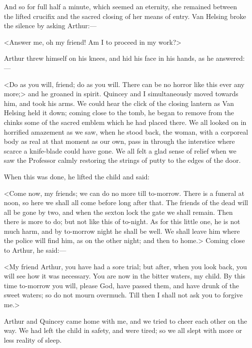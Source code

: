 And so for full half a minute, which seemed an eternity, she remained between the lifted crucifix and the sacred closing of her means of entry. Van Helsing broke the silence by asking Arthur:—

<Answer me, oh my friend! Am I to proceed in my work?>

Arthur threw himself on his knees, and hid his face in his hands, as he answered:—

<Do as you will, friend; do as you will. There can be no horror like this ever any more;> and he groaned in spirit. Quincey and I simultaneously moved towards him, and took his arms. We could hear the click of the closing lantern as Van Helsing held it down; coming close to the tomb, he began to remove from the chinks some of the sacred emblem which he had placed there. We all looked on in horrified amazement as we saw, when he stood back, the woman, with a corporeal body as real at that moment as our own, pass in through the interstice where scarce a knife-blade could have gone. We all felt a glad sense of relief when we saw the Professor calmly restoring the strings of putty to the edges of the door.

When this was done, he lifted the child and said:

<Come now, my friends; we can do no more till to-morrow. There is a funeral at noon, so here we shall all come before long after that. The friends of the dead will all be gone by two, and when the sexton lock the gate we shall remain. Then there is more to do; but not like this of to-night. As for this little one, he is not much harm, and by to-morrow night he shall be well. We shall leave him where the police will find him, as on the other night; and then to home.> Coming close to Arthur, he said:—

<My friend Arthur, you have had a sore trial; but after, when you look back, you will see how it was necessary. You are now in the bitter waters, my child. By this time to-morrow you will, please God, have passed them, and have drunk of the sweet waters; so do not mourn overmuch. Till then I shall not ask you to forgive me.>

Arthur and Quincey came home with me, and we tried to cheer each other on the way. We had left the child in safety, and were tired; so we all slept with more or less reality of sleep.

 

